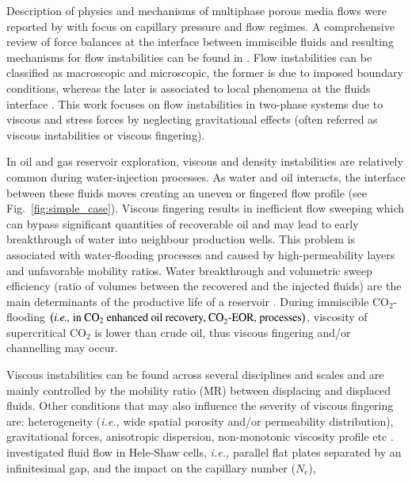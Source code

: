 \documentclass[preprint,authoryear,12pt]{elsarticle}
\newcommand{\eg}{{\it e.g., }}
\newcommand{\ie}{{\it i.e., }}
\begin{document}
\medskip
Description of physics and mechanisms of multiphase porous media flows were reported by \citet{wooding_1976} with focus on capillary pressure and flow regimes. A comprehensive review of force balances at the interface between immiscible fluids and resulting mechanisms for flow instabilities can be found in \citet{homsy_1987}. Flow instabilities can be classified as macroscopic and microscopic, the former is due to imposed boundary conditions, whereas the later is associated to local phenomena at the fluids interface \citep[\eg Kelvin-Helmholtz and Saffman-Taylor instabilities,][]{saffman_1959}. This work focuses on flow instabilities in two-phase systems due to viscous and stress forces by neglecting gravitational effects (often referred as viscous instabilities or viscous fingering). %

\medskip
In oil and gas reservoir exploration, viscous and density instabilities are relatively common during water-injection processes. As water and oil interacts, the interface between these fluids moves creating an uneven or fingered flow profile (see Fig.~\ref{fig:simple_case}). Viscous fingering results in inefficient flow sweeping which can bypass significant quantities of recoverable oil and may lead to early breakthrough of water into neighbour production wells. This problem is associated with water-flooding processes and caused by high-permeability layers and unfavorable mobility ratios. Water breakthrough and volumetric sweep efficiency (ratio of volumes between the recovered and the injected fluids) are the main determinants of the productive life of a reservoir \citep{riaz_2004, tavassoli_2015}. During immiscible CO$_{2}$-flooding $\left(\text{\ie in CO}_{2}\text{ enhanced oil recovery, CO}_{2}\text{-EOR, processes}\right)$, viscosity of supercritical CO$_{2}$ is lower than crude oil, thus viscous fingering and/or channelling may occur. 

\medskip
Viscous instabilities can be found across several disciplines and scales and are mainly controlled by the mobility ratio (MR) between displacing and displaced fluids. Other conditions that may also influence the severity of viscous fingering are: heterogeneity (\ie wide spatial porosity and/or permeability distribution), gravitational forces, anisotropic dispersion, non-monotonic viscosity profile etc \citep{budek_2017,nicolaides_2015}. \citet{muskat_1934} investigated fluid flow in Hele-Shaw cells, \ie parallel flat plates separated by an infinitesimal gap, and the impact on the capillary number ($N_{c}$),
\end{document}
